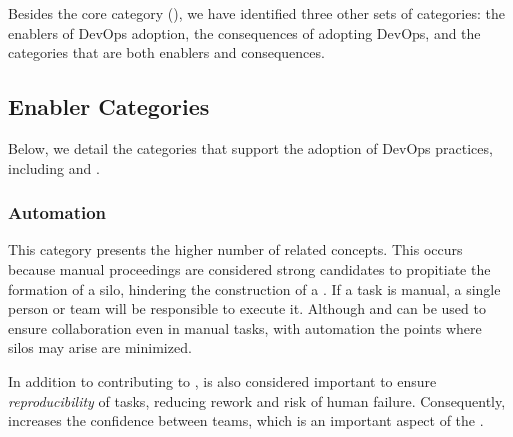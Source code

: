 
Besides the core category (\cc), we have identified
three other sets of categories: the enablers
of DevOps adoption, the consequences of adopting
DevOps, and the categories that are both enablers and consequences.

\subsection{Enabler Categories}

Below, we detail the categories that support the adoption of
DevOps practices, including  and .

\subsubsection{Automation} \label{ssec:automation}

This category presents the higher number of related concepts. This
occurs because manual proceedings are considered strong candidates to
propitiate the formation of a silo, hindering the construction
of a \cc. If a task is manual, a single person or
team will be responsible to execute it. Although  and  can
be used to ensure collaboration even in manual tasks, with automation the
points where silos may arise are minimized.


In addition to contributing to ,  is also considered
important to ensure \emph{reproducibility} of tasks, reducing rework and risk of
human failure. Consequently,  increases the confidence
between teams, which is an important aspect of the \cc.

